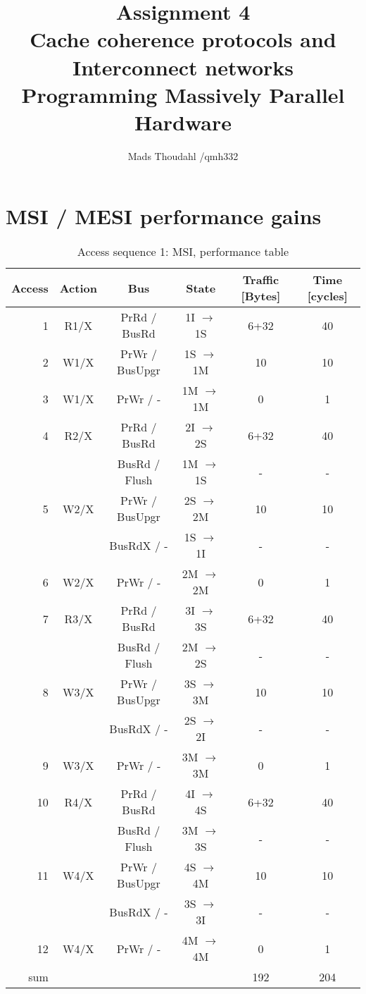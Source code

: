 \documentclass[a4paper,10pt]{article}
\title{Assignment 4 \\ Cache coherence protocols and Interconnect networks \\ Programming Massively Parallel Hardware }
\author{Mads Thoudahl /qmh332}
\begin{document}
\maketitle
\section{MSI / MESI performance gains}

\begin{table}[h]
  \centering
  \begin{tabular}{rccccc}
    Access & Action & Bus & State & Traffic [Bytes] & Time [cycles] \\ \hline
     1 & R1/X & PrRd / BusRd & 1I $\rightarrow$ 1S  & 6+32 & 40 \\
     2 & W1/X & PrWr / BusUpgr & 1S $\rightarrow$ 1M & 10 & 10 \\
     3 & W1/X & PrWr / - & 1M $\rightarrow$ 1M & 0 & 1 \\

     4 & R2/X & PrRd / BusRd & 2I $\rightarrow$ 2S  & 6+32 & 40 \\
       &      & BusRd / Flush & 1M $\rightarrow$ 1S & - & - \\
     5 & W2/X & PrWr / BusUpgr & 2S $\rightarrow$ 2M & 10 & 10 \\
       &      & BusRdX / - & 1S $\rightarrow$ 1I & - & - \\
     6 & W2/X & PrWr / - & 2M $\rightarrow$ 2M & 0 & 1 \\

     7 & R3/X & PrRd / BusRd & 3I $\rightarrow$ 3S  & 6+32 & 40 \\
       &      & BusRd / Flush & 2M $\rightarrow$ 2S & - & - \\
     8 & W3/X & PrWr / BusUpgr & 3S $\rightarrow$ 3M & 10 & 10 \\
       &      & BusRdX / - & 2S $\rightarrow$ 2I & - & - \\
     9 & W3/X & PrWr / - & 3M $\rightarrow$ 3M & 0 & 1 \\

    10 & R4/X & PrRd / BusRd & 4I $\rightarrow$ 4S  & 6+32 & 40 \\
       &      & BusRd / Flush & 3M $\rightarrow$ 3S & - & - \\
    11 & W4/X & PrWr / BusUpgr & 4S $\rightarrow$ 4M & 10 & 10 \\
       &      & BusRdX / - & 3S $\rightarrow$ 3I & - & - \\
    12 & W4/X & PrWr / - & 4M $\rightarrow$ 4M & 0 & 1 \\ \hline

    sum & & & & 192 & 204 \\ \hline \hline
  \end{tabular}
  \caption{Access sequence 1: MSI, performance table}
  \label{tab:msi_1}
\end{table}
\end{document}
